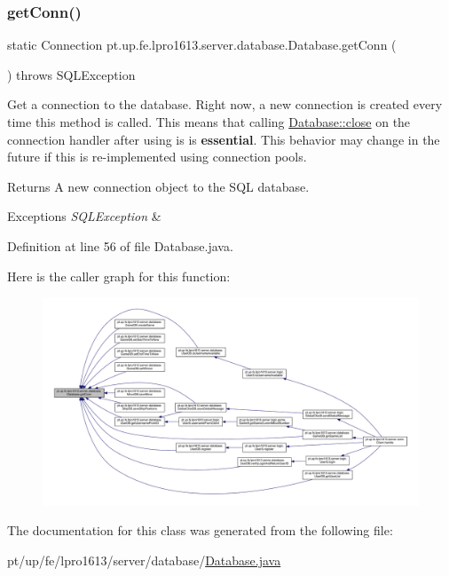 \subsubsection{\texorpdfstring{get\+Conn()}{getConn()}}
{\footnotesize\ttfamily static Connection pt.\+up.\+fe.\+lpro1613.\+server.\+database.\+Database.\+get\+Conn (\begin{DoxyParamCaption}{ }\end{DoxyParamCaption}) throws S\+Q\+L\+Exception\hspace{0.3cm}{\ttfamily [static]}}

Get a connection to the database. Right now, a new connection is created every time this method is called. This means that calling {\ttfamily \hyperlink{classpt_1_1up_1_1fe_1_1lpro1613_1_1server_1_1database_1_1_database_ae7e6a39f412e24bea44477224f0fdef0}{Database\+::close}} on the connection handler after using is is {\bfseries essential}. This behavior may change in the future if this is re-\/implemented using connection pools. \begin{DoxyReturn}{Returns}
A new connection object to the S\+QL database. 
\end{DoxyReturn}

\begin{DoxyExceptions}{Exceptions}
{\em S\+Q\+L\+Exception} & \\
\hline
\end{DoxyExceptions}


Definition at line 56 of file Database.\+java.

Here is the caller graph for this function\+:
\nopagebreak
\begin{figure}[H]
\begin{center}
\leavevmode
\includegraphics[width=350pt]{classpt_1_1up_1_1fe_1_1lpro1613_1_1server_1_1database_1_1_database_aa5ecc24c87d16ca20cc645414d8f3232_icgraph}
\end{center}
\end{figure}


The documentation for this class was generated from the following file\+:\begin{DoxyCompactItemize}
\item 
pt/up/fe/lpro1613/server/database/\hyperlink{_database_8java}{Database.\+java}\end{DoxyCompactItemize}

